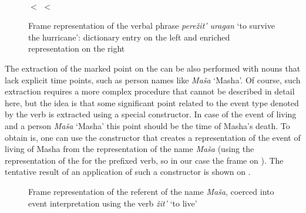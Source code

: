 \begin{figure}
\begin{minipage}{0.7\textwidth}\centering
{}
\end{minipage}\hfill%
\begin{minipage}{0.3\textwidth}\centering
{}\\
 $<$  $<$ \\
\end{minipage}
\caption{Frame representation of the verbal phrase \textit{pere\v{z}it' uragan} `to survive the hurricane': dictionary entry on the left and enriched representation on the right \label{frame:outlive:hurricane}}
\end{figure}

The extraction of the marked point on the  can be also performed with nouns that lack explicit time points, such as person names like \textit{Ma\v{s}a} `Masha'. Of course, such extraction requires a more complex procedure that cannot be described in detail here, but the idea is that some significant point related to the event type denoted by the verb is extracted using a special constructor. In case of the event of living and a person \textit{Ma\v{s}a} `Masha' this point should be the time of Masha's death. To obtain is, one can use the constructor that creates a representation of the event of living of Masha from the representation of the name \textit{Ma\v{s}a} (using the representation of the  for the prefixed verb, so in our case the frame on ). The tentative result of an application of such a constructor is shown on .

\begin{figure}
\centering
{}
\caption{Frame representation of the referent of the name \textit{Ma\v{s}a}, coerced into event interpretation using the verb \textit{\v{z}it'} `to live' \label{frame:Masha:live}}
\end{figure}


